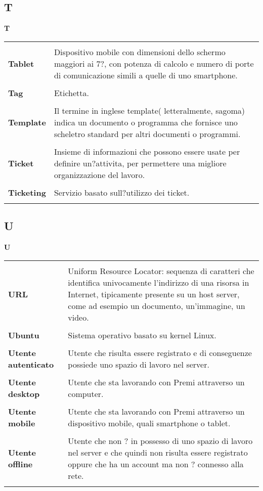 {\subsection{T} 
\hfill\Huge{\textbf{T}} \\ 
\normalsize 
\begin{longtabu} to 
\toprule \\ 
\textbf{Tablet} & Dispositivo mobile con dimensioni dello schermo maggiori ai 7?, con potenza di calcolo e numero di porte di comunicazione simili a quelle di uno smartphone. \\ 
 \\ 
\textbf{Tag} & Etichetta. \\ 
 \\ 
\textbf{Template} & Il termine in inglese template( letteralmente, sagoma) indica un documento o programma che fornisce uno scheletro standard per altri documenti o programmi. \\ 
 \\ 
\textbf{Ticket} & Insieme di informazioni che possono essere usate per definire un?attivita, per permettere una migliore organizzazione del lavoro. \\ 
 \\ 
\textbf{Ticketing} & Servizio basato sull?utilizzo dei ticket. \\ 
 \\ 
\end{longtabu} 
\newpage 
\subsection{U} 
\hfill\Huge{\textbf{U}} \\ 
\normalsize 
\begin{longtabu} to 
\toprule \\ 
\textbf{URL} & Uniform Resource Locator: sequenza di caratteri che identifica univocamente l'indirizzo di una risorsa in Internet, tipicamente presente su un host server, come ad esempio un documento, un'immagine, un video. \\ 
 \\ 
\textbf{Ubuntu} & Sistema operativo basato su kernel Linux. \\ 
 \\ 
\textbf{Utente autenticato} & Utente che risulta essere registrato e di conseguenze possiede uno spazio di lavoro nel server. \\ 
 \\ 
\textbf{Utente desktop} & Utente che sta lavorando con Premi attraverso un computer. \\ 
 \\ 
\textbf{Utente mobile} & Utente che sta lavorando con Premi attraverso un dispositivo mobile, quali smartphone o tablet. \\ 
 \\ 
\textbf{Utente offline} & Utente che non ? in possesso di uno spazio di lavoro nel server e che quindi non risulta essere registrato oppure che ha un account ma non ? connesso alla rete. \\ 
 \\ 
\end{longtabu} 
\newpage 
}

